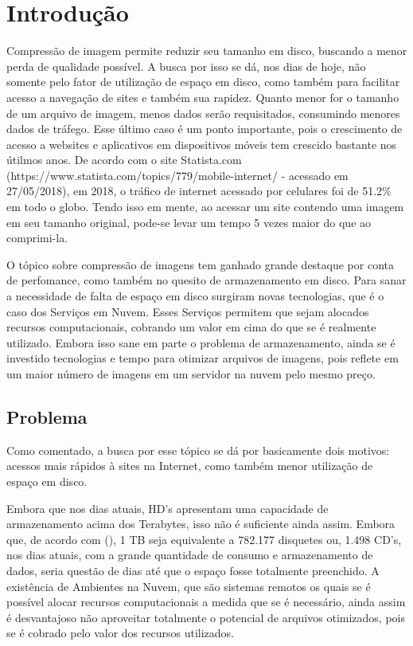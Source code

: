 \chapter{Introdução}
\label{c.introducao}

Compressão de imagem permite reduzir seu tamanho em disco, buscando a menor perda de qualidade possível. A busca por isso se dá, nos dias de hoje, não somente pelo fator de utilização de espaço em disco, como também para facilitar acesso a navegação de sites e também sua rapidez. Quanto menor for o tamanho de um arquivo de imagem, menos dados serão requisitados, consumindo menores dados de tráfego. Esse último caso é um ponto importante, pois o crescimento de acesso a websites e aplicativos em dispositivos móveis tem crescido bastante nos útilmos anos. De acordo com o site Statista.com (https://www.statista.com/topics/779/mobile-internet/ - acessado em 27/05/2018), em 2018, o tráfico de internet acessado por celulares foi de 51.2\% em todo o globo. Tendo isso em mente, ao acessar um site contendo uma imagem em seu tamanho original, pode-se levar um tempo 5 vezes maior do que ao comprimi-la.

O tópico sobre compressão de imagens tem ganhado grande destaque por conta de perfomance, como também no quesito de armazenamento em disco. Para sanar a necessidade de falta de espaço em disco surgiram novas tecnologias, que é o caso dos Serviços em Nuvem. Esses Serviços permitem que sejam alocados recursos computacionais, cobrando um valor em cima do que se é realmente utilizado. Embora isso sane em parte o problema de armazenamento, ainda se é investido tecnologias e tempo para otimizar arquivos de imagens, pois reflete em um maior número de imagens em um servidor na nuvem pelo mesmo preço.

\section{Problema}
\label{s.problema}

Como comentado, a busca por esse tópico se dá por basicamente dois motivos: acessos mais rápidos à sites na Internet, como também menor utilização de espaço em disco.

Embora que nos dias atuais, HD's apresentam uma capacidade de armazenamento acima dos Terabytes, isso não é suficiente ainda assim. Embora que, de acordo com  (\citeyear{linauthor}), 1 TB seja equivalente a 782.177 disquetes ou, 1.498 CD's, nos dias atuais, com a grande quantidade de consumo e armazenamento de dados, seria questão de dias até que o espaço fosse totalmente preenchido. A existência de Ambientes na Nuvem, que são sistemas remotos os quais se é possível alocar recursos computacionais a medida que se é necessário, ainda assim é desvantajoso não aproveitar totalmente o potencial de arquivos otimizados, pois se é cobrado pelo valor dos recursos utilizados.

